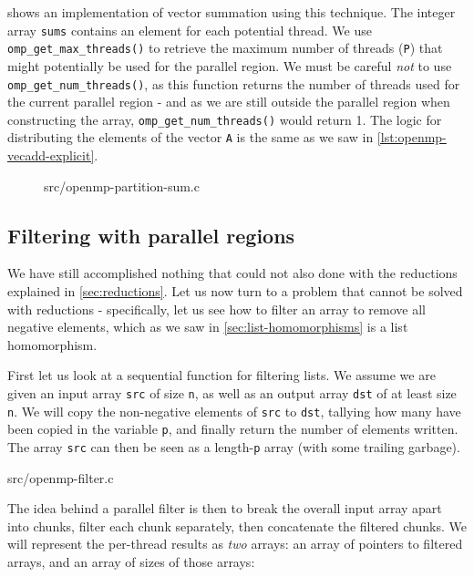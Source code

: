  shows an implementation of vector
summation using this technique. The integer array \texttt{sums}
contains an element for each potential thread. We use
\texttt{omp\_get\_max\_threads()} to retrieve the maximum number of
threads (\texttt{P}) that might potentially be used for the parallel
region. We must be careful \emph{not} to use
\texttt{omp\_get\_num\_threads()}, as this function returns the number
of threads used for the current parallel region - and as we are still
outside the parallel region when constructing the array,
\texttt{omp\_get\_num\_threads()} would return 1. The logic for
distributing the elements of the vector \texttt{A} is the same as we
saw in \cref{lst:openmp-vecadd-explicit}.

\begin{figure}

{src/openmp-partition-sum.c}
\end{figure}

\subsection{Filtering with parallel regions}

We have still accomplished nothing that could not also done with the
reductions explained in \cref{sec:reductions}. Let us now turn to a
problem that cannot be solved with reductions - specifically, let us
see how to filter an array to remove all negative elements, which as
we saw in \cref{sec:list-homomorphisms} is a list homomorphism.

First let us look at a sequential function for filtering lists. We
assume we are given an input array \texttt{src} of size \texttt{n}, as
well as an output array \texttt{dst} of at least size \texttt{n}. We
will copy the non-negative elements of \texttt{src} to \texttt{dst},
tallying how many have been copied in the variable \texttt{p}, and
finally return the number of elements written. The array \texttt{src}
can then be seen as a length-\texttt{p} array (with some trailing
garbage).


{src/openmp-filter.c}

The idea behind a parallel filter is then to break the overall input
array apart into chunks, filter each chunk separately, then
concatenate the filtered chunks. We will represent the per-thread
results as \emph{two} arrays: an array of pointers to filtered arrays,
and an array of sizes of those arrays:

